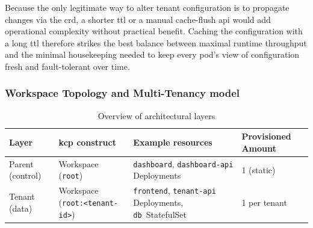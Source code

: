 \documentclass[11pt, a4paper, oneside, listof=totoc]{scrartcl}
\begin{document}
                Because the only legitimate way to alter tenant configuration is to propagate
                changes via the \gls{crd}, a shorter \gls{ttl} or a manual cache-flush \gls{api}
                would add operational complexity without practical benefit.
                Caching the configuration with a long \gls{ttl} therefore strikes the best balance
                between maximal runtime throughput and the minimal housekeeping needed to keep every
                pod's view of configuration fresh and fault-tolerant over time.

            \subsubsection{Workspace Topology and Multi-Tenancy model}\label{subsubsec:workspaceTopology}
                \begin{table}[H]\label{tab:layersOverview}
                    \centering
                    \renewcommand{\arraystretch}{1.25}
                    \setlength{\tabcolsep}{6pt}
                    \begin{tabularx}{\textwidth}{@{} l C{3cm} Y R{2.2cm} @{}}
                        Layer & \gls{kcp} construct & Example resources & Provisioned Amount \\
                        \midrule
                        Parent (control) & Workspace (\texttt{root}) & \texttt{dashboard}, \texttt{dashboard-api} Deployments & 1 (static) \\
                        Tenant (data) & Workspace (\texttt{root:<tenant-id>}) & \texttt{frontend}, \texttt{tenant-api} Deployments, \texttt{\gls{db}}~StatefulSet & 1 per tenant \\
                        \bottomrule
                    \end{tabularx}
                    \caption{Overview of architectural layers}
                \end{table}
\end{document}
